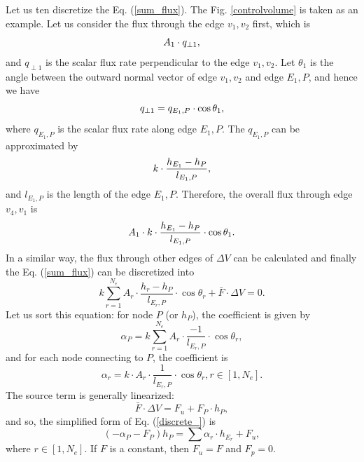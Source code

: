 \documentclass{article}        %
\begin{document}
Let us ten discretize the Eq. (\ref{sum_flux}). The Fig. \ref{controlvolume} is taken as an example. Let us consider the flux through the edge $v_1,v_2$ first, which is
\begin{equation}
A_{1} \cdot {q_{\perp 1}}, \notag
\end{equation}
and ${q_{\perp 1}}$ is the scalar flux rate perpendicular to the edge $v_1,v_2$. Let $\theta_{1}$ is the angle between the outward normal vector of edge $v_1,v_2$ and edge $E_1, P$, and hence we have
\begin{equation}
{q_{\perp 1}} = {q_{E_1, P}} \cdot \cos{\theta_{1}}, \notag
\end{equation}
where ${q_{E_1, P}}$ is the scalar flux rate along edge $E_1, P$. The  ${q_{E_1, P}}$ can be approximated by
\begin{equation}
	k\cdot \frac{h_{E_1} - h_P}{l_{E_1, P}}, \notag
\end{equation}
and $l_{E_1, P}$ is the length of the edge ${E_1, P}$. Therefore, the overall flux through edge $v_4,v_1$ is
\begin{equation}
	A_{1} \cdot 	k\cdot \frac{h_{E_1} - h_P}{l_{E_1, P}} \cdot \cos{\theta_{1}}. \notag	
\end{equation}
In a similar way, the flux through other edges of $\Delta V$ can be calculated and finally the Eq. (\ref{sum_flux}) can be discretized into
\begin{equation}
k\sum_{r = 1}^{N_e}A_{r}\cdot \frac{h_{r} - h_P}{l_{E_r, P}}\cdot \cos{\theta_{r}} + \bar{F}\cdot \Delta V = 0.
\label{discrete_} 
\end{equation}
Let us sort this equation: for node $P$ (or $h_P$), the coefficient is given by
\begin{equation}
\alpha_P = k\sum_{r = 1}^{N_e}A_{r}\cdot \frac{-1}{l_{E_r, P}}\cdot \cos{\theta_{r}}, 
\end{equation}
and for each node connecting to $P$, the coefficient is
\begin{equation}
\alpha_r = k \cdot A_{r}\cdot \frac{1}{l_{E_r, P}}\cdot \cos{\theta_{r}}, r \in [1, N_e].
\end{equation}
The source term is generally linearized:
\begin{equation}
\bar{F}\cdot \Delta V = F_u + F_P\cdot h_P,
\end{equation}
and so, the simplified form of Eq. (\ref{discrete_}) is
\begin{equation}
\left(-\alpha_P -F_P\right) h_P = \sum\alpha_r\cdot h_{E_r} + F_u,
\end{equation}
where $r \in [1, N_e]$. If $F$ is a constant, then $F_u = F$ and $F_p = 0$.
\end{document}
